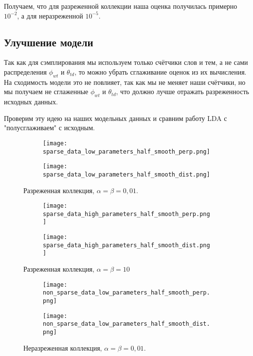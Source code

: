 \documentclass[12pt]{article}
\begin{document}
Получаем, что для разреженной коллекции наша оценка получилась примерно $ 10^{-2} $, а для неразреженной $ 10^{-5} $.

\subsection{Улучшение модели}

Так как для сэмплирования мы используем только счётчики слов и тем, а не сами распределения $ \phi_{wt} $ и $ \theta_{td} $, то можно убрать сглаживание оценок из их вычисления.
На сходимость модели это не повлияет, так как мы не меняет наши счётчики, но мы получаем не сглаженные $ \phi_{wt} $ и $ \theta_{td} $, что должно лучше отражать разреженность исходных данных.

Проверим эту идею на наших модельных данных и сравним работу LDA с "полусглаживаем" с исходным.

\begin{figure}[hbtp]
  \centering
  \begin{subfigure}[b]{0.49\textwidth}
    \centering
    \texttt{[image: sparse\_data\_low\_parameters\_half\_smooth\_perp.png]}
  \end{subfigure}
  \begin{subfigure}[b]{0.49\textwidth}
    \centering
    \texttt{[image: sparse\_data\_low\_parameters\_half\_smooth\_dist.png]}
  \end{subfigure}
  \caption{Разреженная коллекция, $ \alpha = \beta = 0,01 $.}
  \label{fig:sparse_data_low_parameters_half_smooth}
\end{figure}

\begin{figure}[hbtp]
  \centering
  \begin{subfigure}[b]{0.49\textwidth}
    \centering
    \texttt{[image: sparse\_data\_high\_parameters\_half\_smooth\_perp.png]}
  \end{subfigure}
  \begin{subfigure}[b]{0.49\textwidth}
    \centering
    \texttt{[image: sparse\_data\_high\_parameters\_half\_smooth\_dist.png]}
  \end{subfigure}
  \caption{Разреженная коллекция, $ \alpha = \beta = 10 $}
  \label{fig:sparse_data_high_parameters_half_smooth}
\end{figure}

\begin{figure}[p]
  \centering
  \begin{subfigure}[b]{0.49\textwidth}
    \centering
    \texttt{[image: non\_sparse\_data\_low\_parameters\_half\_smooth\_perp.png]}
  \end{subfigure}
  \begin{subfigure}[b]{0.49\textwidth}
    \centering
    \texttt{[image: non\_sparse\_data\_low\_parameters\_half\_smooth\_dist.png]}
  \end{subfigure}
  \caption{Неразреженная коллекция, $ \alpha = \beta = 0,01 $.}
  \label{fig:non_sparse_data_low_parameters_half_smooth}
\end{figure}
\end{document}
